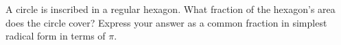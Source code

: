 A circle is inscribed in a regular hexagon. What fraction of the hexagon's area does the circle cover? Express your answer as a common fraction in simplest radical form in terms of \(\pi\).
